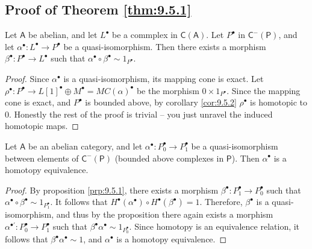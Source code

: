 \subsection{Proof of Theorem \ref{thm:9.5.1}}
\begin{proposition}\label{prp:9.5.1}
	Let $\mathsf{A} $ be abelian, and let $L^{\bullet} $ be a commplex in $\mathsf{C} (\mathsf{A} )$. Let $P^{\bullet} $ in $\mathsf{C} ^-(\mathsf{P} )$, and let $\alpha ^{\bullet} : L^{\bullet}  \to P^{\bullet} $ be a quasi-isomorphism. Then there exists a morphism $\beta ^{\bullet} : P^{\bullet}  \to L^{\bullet} $ such that $\alpha ^{\bullet} \circ \beta ^{\bullet} \sim 1_{P^{\bullet} } $.
\end{proposition}
\begin{proof}
	Since $\alpha ^{\bullet} $ is a quasi-isomorphism, its mapping cone is exact. Let $\rho ^{\bullet} : P^{\bullet}  \to L[1]^{\bullet} \oplus M^{\bullet} =MC(\alpha )^{\bullet} $ be the morphism $0\times 1_{P^{\bullet} } $. Since the mapping cone is exact, and $P^{\bullet} $ is bounded above, by corollary \ref{cor:9.5.2} $\rho ^{\bullet} $ is homotopic to 0. Honestly the rest of the proof is trivial -- you just unravel the induced homotopic maps.
\end{proof}
\begin{theorem}\label{thm:9.5.1}
	Let $\mathsf{A} $ be an abelian category, and let $\alpha ^{\bullet} : P_0^{\bullet}  \to P_1^{\bullet} $ be a quasi-isomorphism between elements of $\mathsf{C} ^{-} (\mathsf{P} )$ (bounded above complexes in $\mathsf{P} $). Then $\alpha ^{\bullet} $ is a homotopy equivalence.
\end{theorem}
\begin{proof}
	By proposition \ref{prp:9.5.1}, there exists a morphism $\beta ^{\bullet} : P^{\bullet}_1 \to P^{\bullet}_0$ such that $\alpha ^{\bullet} \circ \beta ^{\bullet} \sim 1_{P_1^{\bullet} } $. It follows that $H^{\bullet} (\alpha ^{\bullet} )\circ H^{\bullet} (\beta ^{\bullet} )=1$. Therefore, $\beta ^{\bullet} $ is a quasi-isomorphism, and thus by the proposition there again exists a morphism $\alpha ^{\bullet\prime}: P_0^{\bullet}  \to P_1^{\bullet} $ such that $\beta ^{\bullet} \alpha ^{\bullet} \sim 1_{P_0^{\bullet} } $. Since homotopy is an equivalence relation, it follows that $\beta ^{\bullet} \alpha ^{\bullet} \sim 1$, and $\alpha ^{\bullet} $ is a homotopy equivalence.
\end{proof}

